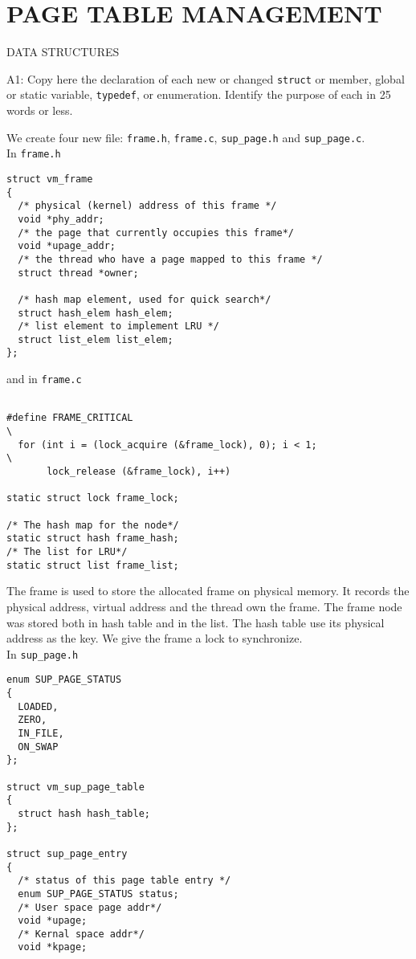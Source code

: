 \section*{PAGE TABLE MANAGEMENT}

\begin{aspect}{DATA STRUCTURES}
  \begin{qc}
    A1: Copy here the declaration of each new or changed \lstinline{struct} or member,
    global or static variable, \lstinline{typedef}, or enumeration.
    Identify the purpose of each in 25 words or less.
  \end{qc}
  We create four new file: \texttt{frame.h}, \texttt{frame.c}, \texttt{sup\_page.h} and \texttt{sup\_page.c}.\\
  In \texttt{frame.h}
  \begin{lstlisting}
struct vm_frame
{
  /* physical (kernel) address of this frame */
  void *phy_addr;
  /* the page that currently occupies this frame*/
  void *upage_addr;
  /* the thread who have a page mapped to this frame */
  struct thread *owner;

  /* hash map element, used for quick search*/
  struct hash_elem hash_elem;
  /* list element to implement LRU */
  struct list_elem list_elem;
};
	\end{lstlisting}
  and in \texttt{frame.c}
  \begin{lstlisting}

#define FRAME_CRITICAL                                                        \
  for (int i = (lock_acquire (&frame_lock), 0); i < 1;                        \
       lock_release (&frame_lock), i++)

static struct lock frame_lock;

/* The hash map for the node*/
static struct hash frame_hash;
/* The list for LRU*/
static struct list frame_list;
	\end{lstlisting}
  The frame is used to store the allocated frame on physical memory. It records the physical address, virtual address and the thread own the frame. The frame node was stored both in hash table and in the list. The hash table use its physical address as the key. We give the frame a lock to synchronize.\\
  In \texttt{sup\_page.h}
  \begin{lstlisting}
enum SUP_PAGE_STATUS
{
  LOADED,
  ZERO,
  IN_FILE,
  ON_SWAP
};

struct vm_sup_page_table
{
  struct hash hash_table;
};

struct sup_page_entry
{
  /* status of this page table entry */
  enum SUP_PAGE_STATUS status;
  /* User space page addr*/
  void *upage;
  /* Kernal space addr*/
  void *kpage;


\end{lstlisting}
\end{aspect}

